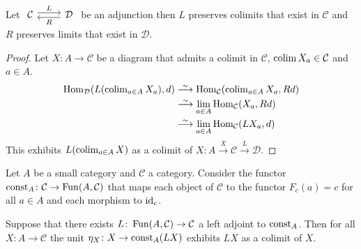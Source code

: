 \begin{prop}
    Let $\begin{tikzcd}
        \mathcal{C}
        \arrow[r, shift left, "L"]
        &
        \mathcal{D}
        \arrow[l, shift left, "R"]
    \end{tikzcd}$
    be an adjunction then $L$ preserves colimits that exist in $\mathcal{C}$ and $R$ preserves limits that exist in $\mathcal{D}$.
\end{prop}

\begin{proof}
    Let $X\colon A \to \mathcal{C}$ be a diagram that admits a colimit in $\mathcal{C}$, $\operatorname{colim} X_a \in \mathcal{C}$ and $ a \in A$.
    \begin{align}
        \Hom_{\mathcal{D}}(L(\colim_{a \in A} X_a),d) 
        &\isomorphism \Hom_{\mathcal{C}}(\colim_{a \in A} X_a, Rd)
        \\
        &\isomorphism \lim_{a \in A} \Hom_{\mathcal{C}}(X_a,Rd)
        \\
        &\isomorphism \lim_{a \in A} \Hom_{\mathcal{C}}(LX_a,d)
        \\
    \end{align}
    This exhibits $L(\operatorname{colim}_{a \in A} X)$ as a colimit of $X\colon A \xrightarrow{X} \mathcal{C} \xrightarrow{L} \mathcal{D}$.
\end{proof}

Let $A$ be a small category and $\mathcal{C}$ a category.
Consider the functor $\operatorname{const}_A \colon \mathcal{C} \to \operatorname{Fun}(A , \mathcal{C})$
that maps each object of $\mathcal{C}$ to the functor $F_c(a)=c$ for all $a \in A$ and each morphism to $\operatorname{id}_c$.

\begin{prop}
    Suppose that there exists $L \colon \operatorname{Fun}(A,\mathcal{C}) \to \mathcal{C}$ a left adjoint to $\operatorname{const}_A$. 
    Then for all $X \colon A  \to \mathcal{C}$ the unit $\eta_X \colon X \to \operatorname{const}_A(LX)$ exhibits $LX$ as a colimit of $X$.
\end{prop}

